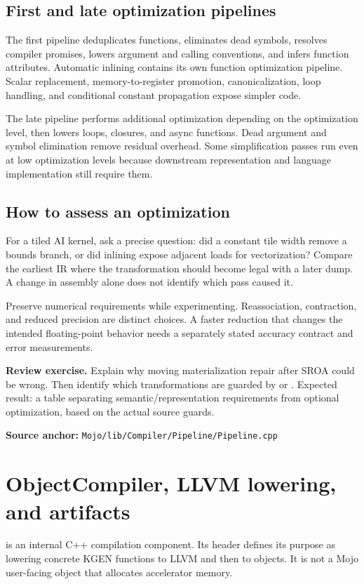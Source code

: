 \documentclass[11pt,a4paper]{article}
\newcommand{\code}[1]{\texttt{\detokenize{#1}}}
\newcommand{\src}[1]{\par{\small\textbf{Source anchor:} \nolinkurl{#1}}\par}
\newcommand{\chapterpage}[1]{\clearpage\section{#1}}
\begin{document}
\subsection{First and late optimization pipelines}
The first pipeline deduplicates functions, eliminates dead symbols, resolves compiler promises, lowers argument and calling conventions, and infers function attributes. Automatic inlining contains its own function optimization pipeline. Scalar replacement, memory-to-register promotion, canonicalization, loop handling, and conditional constant propagation expose simpler code.

The late pipeline performs additional optimization depending on the optimization level, then lowers loops, closures, and async functions. Dead argument and symbol elimination remove residual overhead. Some simplification passes run even at low optimization levels because downstream representation and language implementation still require them.

\subsection{How to assess an optimization}
For a tiled AI kernel, ask a precise question: did a constant tile width remove a bounds branch, or did inlining expose adjacent loads for vectorization? Compare the earliest IR where the transformation should become legal with a later dump. A change in assembly alone does not identify which pass caused it.

Preserve numerical requirements while experimenting. Reassociation, contraction, and reduced precision are distinct choices. A faster reduction that changes the intended floating-point behavior needs a separately stated accuracy contract and error measurements.

\textbf{Review exercise.} Explain why moving materialization repair after SROA could be wrong. Then identify which transformations are guarded by \code{optimizationLevel >= 1} or \code{>= 2}. Expected result: a table separating semantic/representation requirements from optional optimization, based on the actual source guards.
\src{Mojo/lib/Compiler/Pipeline/Pipeline.cpp}

\chapterpage{ObjectCompiler, LLVM lowering, and artifacts}
\code{M::KGEN::ObjectCompiler} is an internal C++ compilation component. Its header defines its purpose as lowering concrete KGEN functions to LLVM and then to objects. It is not a Mojo user-facing object that allocates accelerator memory.
\end{document}
